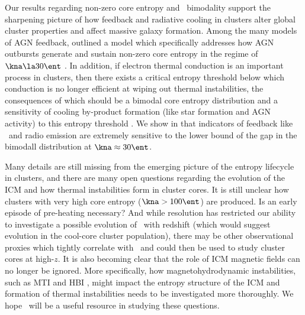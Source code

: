 \documentclass{emulateapj}
\begin{document}
Our results regarding non-zero core entropy and \kna\ bimodality
support the sharpening picture of how feedback and radiative cooling
in clusters alter global cluster properties and affect massive galaxy
formation. Among the many models of AGN feedback, \citet{agnframework}
outlined a model which specifically addresses how AGN outbursts
generate and sustain non-zero core entropy in the regime of $\kna \la
30 \ent$ \citep[see also][]{kaiser03}. In addition, if electron
thermal conduction is an important process in clusters, then there
exists a critical entropy threshold below which conduction is no
longer efficient at wiping out thermal instabilities, the consequences
of which should be a bimodal core entropy distribution and a
sensitivity of cooling by-product formation (like star formation and
AGN activity) to this entropy threshold \citep{conduction,
  2008arXiv0804.3823G}. We show in \citet{haradent} that indicators of
feedback like \halpha\ and radio emission are extremely sensitive to
the lower bound of the gap in the bimodall distribution at $\kna
\approx 30 \ent$.

Many details are still missing from the emerging picture of the
entropy lifecycle in clusters, and there are many open questions
regarding the evolution of the ICM and how thermal instabilities form
in cluster cores. It is still unclear how clusters with very high core
entropy ($\kna > 100 \ent$) are produced. Is an early episode of
pre-heating necessary? And while resolution has restricted our ability
to investigate a possible evolution of \kna\ with redshift (which
would suggest evolution in the cool-core cluster population), there
may be other observational proxies which tightly correlate with
\kna\ and could then be used to study cluster cores at high-$z$. It is
also becoming clear that the role of ICM magnetic fields can no longer
be ignored. More specifically, how magnetohydrodynamic instabilities,
such as MTI \citep{2000ApJ...534..420B, 2008ApJ...673..758Q} and HBI
\citep{2008ApJ...677L...9P}, might impact the entropy structure of the
ICM and formation of thermal instabilities needs to be investigated
more thoroughly. We hope \accept\ will be a useful resource in
studying these questions.

\acknowledgements
\end{document}
